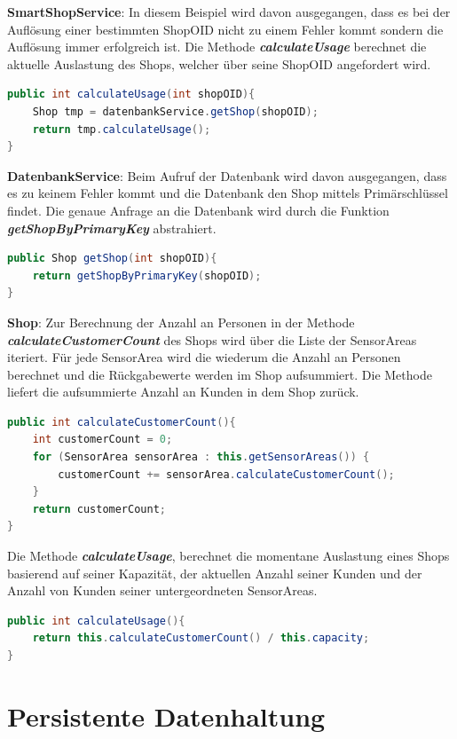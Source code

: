 \documentclass[runningheads]{llncs}
\begin{document}
\textbf{SmartShopService}: In diesem Beispiel wird davon ausgegangen, dass es bei der Auflösung einer bestimmten ShopOID nicht zu einem Fehler kommt sondern die Auflösung immer erfolgreich ist.
Die Methode \textbf{\textit{calculateUsage}} berechnet die aktuelle Auslastung des Shops, welcher über seine ShopOID angefordert wird.
\begin{lstlisting}[language=Java, basicstyle=\scriptsize]
public int calculateUsage(int shopOID){
	Shop tmp = datenbankService.getShop(shopOID);
	return tmp.calculateUsage();
}
\end{lstlisting}


\textbf{DatenbankService}: Beim Aufruf der Datenbank wird davon ausgegangen, dass es zu keinem Fehler kommt und die Datenbank den Shop mittels Primärschlüssel findet.
Die genaue Anfrage an die Datenbank wird durch die Funktion \textbf{\textit{getShopByPrimaryKey}} abstrahiert.
\begin{lstlisting}[language=Java, basicstyle=\scriptsize]
public Shop getShop(int shopOID){
	return getShopByPrimaryKey(shopOID);
}
\end{lstlisting}

\break
\textbf{Shop}: Zur Berechnung der Anzahl an Personen in der Methode \textbf{\textit{calculateCustomerCount}} des Shops wird über die Liste der SensorAreas iteriert.
Für jede SensorArea wird die wiederum die Anzahl an Personen berechnet und die Rückgabewerte werden im Shop aufsummiert.
Die Methode liefert die aufsummierte Anzahl an Kunden in dem Shop zurück.
\begin{lstlisting}[language=Java, basicstyle=\scriptsize]
public int calculateCustomerCount(){
	int customerCount = 0;
	for (SensorArea sensorArea : this.getSensorAreas()) {
		customerCount += sensorArea.calculateCustomerCount();
	}
	return customerCount;
}
\end{lstlisting}

Die Methode \textbf{\textit{calculateUsage}}, berechnet die momentane Auslastung eines Shops basierend auf seiner Kapazität, der aktuellen Anzahl seiner Kunden und der Anzahl von Kunden seiner untergeordneten SensorAreas.
\begin{lstlisting}[language=Java, basicstyle=\scriptsize]
public int calculateUsage(){
	return this.calculateCustomerCount() / this.capacity;
}
\end{lstlisting}

\newpage
\section{Persistente Datenhaltung}
\end{document}
